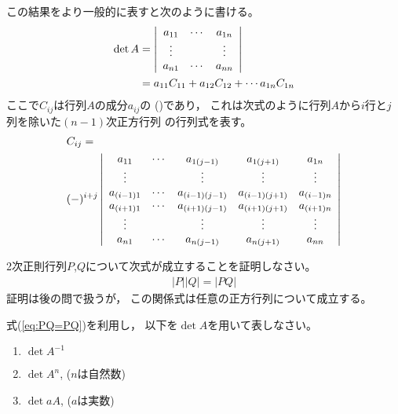 \documentclass[twocolumn,11pt]{jarticle}
\begin{document}
\comment
この結果をより一般的に表すと次のように書ける。
\begin{align}
\det A&=\left|
        \begin{array}{ccc}
          a_{11}&\cdots&a_{1n}\\
          \vdots&  &\vdots\\
          a_{n1}&\cdots&a_{nn}
        \end{array}\right|\notag\\
  &=a_{11}C_{11}+a_{12}C_{12}+\cdots a_{1n}C_{1n}\notag
\end{align}
ここで$C_{ij}$は行列$A$の成分$a_{ij}$の
()であり，
これは次式のように行列$A$から$i$行と$j$列を除いた$(n-1)$次正方行列
の行列式を表す。
{\small
\begin{align}
&C_{ij}=\notag\\
&(-)^{i+j}
\left|
\begin{array}{ccccc}
  a_{11}&\cdots&a_{1(j-1)}&a_{1(j+1)}&a_{1n}\\
  \vdots&&\vdots&\vdots&\vdots\\
  a_{(i-1)1}&\cdots&a_{(i-1)(j-1)}&a_{(i-1)(j+1)}&a_{(i-1)n}\\
  a_{(i+1)1}&\cdots&a_{(i+1)(j-1)}&a_{(i+1)(j+1)}&a_{(i+1)n}\\
  \vdots&&\vdots&\vdots&\vdots\\
  a_{n1}&\cdots&a_{n(j-1)}&a_{n(j+1)}&a_{nn}
\end{array}\right|\notag
\end{align}
}

\nquestion
2次正則行列$P$,$Q$について次式が成立することを証明しなさい。
\begin{align}
\label{eq:PQ=PQ}
|P||Q|=|PQ|
\end{align}
証明は後の問で扱うが，
この関係式は任意の正方行列について成立する。

\nquestion 式(\ref{eq:PQ=PQ})を利用し，
以下を$\det A$を用いて表しなさい。
\begin{enumerate}
\item $\det A^{-1}$
\item $\det A^n$, ($n$は自然数)
\item $\det aA$, ($a$は実数)
\end{enumerate}
\end{document}
